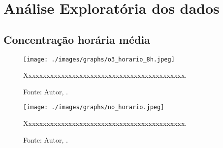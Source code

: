 \chapter{Análise Exploratória dos dados}



\section{Concentração horária média}


\lipsum[100]




\begin{figure}[H]
    \centering
    \texttt{[image: ./images/graphs/o3\_horario\_8h.jpeg]}
    \caption{Xxxxxxxxxxxxxxxxxxxxxxxxxxxxxxxxxxxxxxxxxxxx.}
    \label{fig:o3_horario_8h.jpeg}
    \caption*{Fonte: Autor, \imprimirdata.}
\end{figure}




\lipsum[100]




\begin{figure}[H]
    \centering
    \texttt{[image: ./images/graphs/no\_horario.jpeg]}
    \caption{Xxxxxxxxxxxxxxxxxxxxxxxxxxxxxxxxxxxxxxxxxxxx.}
    \label{fig:no_horario.jpeg}
    \caption*{Fonte: Autor, \imprimirdata.}
\end{figure}

